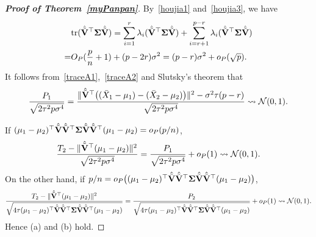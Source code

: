 \documentclass[times,sort&compress,3p]{elsarticle}
\newcommand{\mytr}{ {\rm tr} }
\theoremstyle{plain}
\theoremstyle{definition}
\theoremstyle{remark}
\begin{document}
\begin{appendices}
\begin{proof}[\textbf{Proof of Theorem~\ref{myPanpan}}]
By~\eqref{houjia1} and~\eqref{houjia3}, we have
\begin{equation}\label{traceA2}
    \begin{aligned}
        &\mytr(\hat{\tilde{\BV}}^\top \bSigma\hat{\tilde{\BV}})=
    \sum_{i=1}^r \lambda_i(\hat{\tilde{\BV}}^\top \bSigma\hat{\tilde{\BV}})
    +
    \sum_{i=r+1}^{p-r} \lambda_i(\hat{\tilde{\BV}}^\top \bSigma\hat{\tilde{\BV}})\\
        =&
    O_P(\frac{p}{n}+1)+(p-2r)\sigma^2
        =
        (p-r)\sigma^2+o_P(\sqrt{p}).
    \end{aligned}
\end{equation}
It follows from~\eqref{traceA1},~\eqref{traceA2} and Slutsky's theorem that
$$
\frac{P_1}{\sqrt{2\tau^2 p\sigma^4}}=
\frac{\|\hat{\tilde{\mathbf{V}}}^\top \big((\bar{X}_1-\mu_1)-(\bar{X}_2-\mu_2)\big)\|^2-\sigma^2\tau(p-r) }{\sqrt{2\tau^2 p\sigma^4}}\rightsquigarrow \mathcal{N}(0,1).
$$

If $(\mu_1-\mu_2)^\top  \hat{\tilde{\mathbf{V}}}\hat{\tilde{\mathbf{V}}}^\top  \boldsymbol{\Sigma}\hat{\tilde{\mathbf{V}}}\hat{\tilde{\mathbf{V}}}^\top  (\mu_1-\mu_2)=o_P(p/n)$,
$$
\frac{T_2-\|\hat{\tilde{\mathbf{V}}}^\top  (\mu_1-\mu_2)\|^2}{\sqrt{2\tau^2 p \sigma^4}}
=
\frac{P_1}{\sqrt{2\tau^2 p \sigma^4}}+o_P(1)\rightsquigarrow \mathcal{N}(0,1).
$$
On the other hand, if $p/n=o_P\big((\mu_1-\mu_2)^\top  \hat{\tilde{\mathbf{V}}}\hat{\tilde{\mathbf{V}}}^\top  \boldsymbol{\Sigma}\hat{\tilde{\mathbf{V}}}\hat{\tilde{\mathbf{V}}}^\top  (\mu_1-\mu_2)\big)$,
$$
\frac{T_2-\|\hat{\tilde{\mathbf{V}}}^\top  (\mu_1-\mu_2)\|^2}{\sqrt{4\tau (\mu_1-\mu_2)^\top  \hat{\tilde{\mathbf{V}}}\hat{\tilde{\mathbf{V}}}^\top  \boldsymbol{\Sigma}\hat{\tilde{\mathbf{V}}}\hat{\tilde{\mathbf{V}}}^\top  (\mu_1-\mu_2)}}
=
\frac{P_2}{\sqrt{4\tau (\mu_1-\mu_2)^\top  \hat{\tilde{\mathbf{V}}}\hat{\tilde{\mathbf{V}}}^\top  \boldsymbol{\Sigma}\hat{\tilde{\mathbf{V}}}\hat{\tilde{\mathbf{V}}}^\top  (\mu_1-\mu_2)}}+o_P(1)\rightsquigarrow \mathcal{N}(0,1).
$$
Hence (a) and (b) hold.


\end{proof}
\end{appendices}
\end{document}
